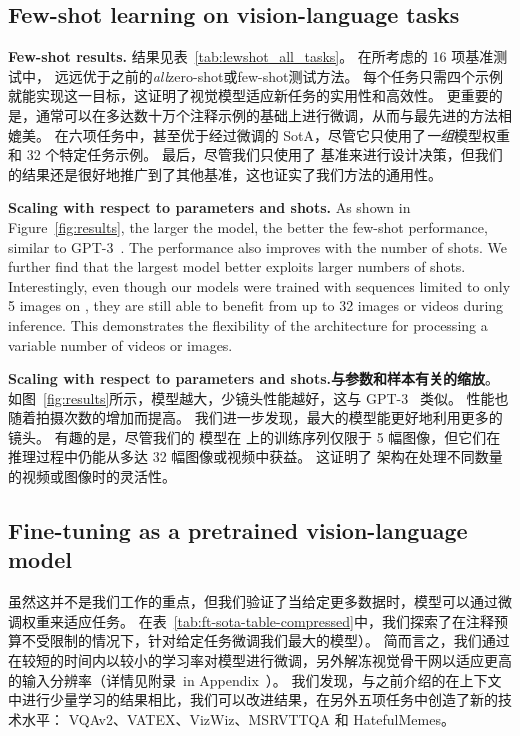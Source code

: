 \subsection{Few-shot learning on vision-language tasks}
\label{sec:fewshot_openended}




\textbf{Few-shot results.}
结果见表~\ref{tab:lewshot_all_tasks}。
\largem{}在所考虑的 16 项基准测试中，\largem{} 远远优于之前的\emph{all}zero-shot或few-shot测试方法。
每个任务只需四个示例就能实现这一目标，这证明了视觉模型适应新任务的实用性和高效性。
更重要的是，\largem{}通常可以在多达数十万个注释示例的基础上进行微调，从而与最先进的方法相媲美。
在六项任务中，\largem{}甚至优于经过微调的 SotA，尽管它只使用了\emph{一组}模型权重和 32 个特定任务示例。
最后，尽管我们只使用了 \dev{} 基准来进行设计决策，但我们的结果还是很好地推广到了其他基准，这也证实了我们方法的通用性。


\textbf{Scaling with respect to parameters and shots.}
As shown in Figure~\ref{fig:results}, the larger the model, the better the few-shot performance, similar to GPT-3~\citep{gpt3}.
The performance also improves with the number of shots.
We further find that the largest model better exploits larger numbers of shots.
Interestingly, even though our \method{} models were trained with sequences limited to only 5 images on \mmmw{}, they are still able to benefit from up to 32 images or videos during inference.
This demonstrates the flexibility of the \method{} architecture for processing a variable number of videos or images.

\textbf{Scaling with respect to parameters and shots.与参数和样本有关的缩放}。
如图~\ref{fig:results}所示，模型越大，少镜头性能越好，这与 GPT-3~\citep{gpt3} 类似。
性能也随着拍摄次数的增加而提高。
我们进一步发现，最大的模型能更好地利用更多的镜头。
有趣的是，尽管我们的 \method{}模型在 \mmmw{}上的训练序列仅限于 5 幅图像，但它们在推理过程中仍能从多达 32 幅图像或视频中获益。
这证明了 \method{} 架构在处理不同数量的视频或图像时的灵活性。


\subsection{Fine-tuning \largem{} as a pretrained vision-language model}
\label{sec:ft_results}

虽然这并不是我们工作的重点，但我们验证了当给定更多数据时，\method{}模型可以通过微调权重来适应任务。
在表~\ref{tab:ft-sota-table-compressed}中，我们探索了在注释预算不受限制的情况下，针对给定任务微调我们最大的模型\largem{}）。
简而言之，我们通过在较短的时间内以较小的学习率对模型进行微调，另外解冻视觉骨干网以适应更高的输入分辨率（详情见附录~in Appendix~）。
我们发现，与之前介绍的在上下文中进行少量学习的结果相比，我们可以改进结果，在另外五项任务中创造了新的技术水平： VQAv2、VATEX、VizWiz、MSRVTTQA 和 HatefulMemes。


